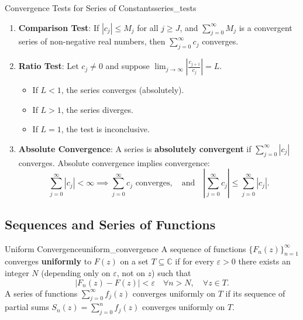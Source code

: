 \begin{theorem}{Convergence Tests for Series of Constants}{series_tests}
\begin{enumerate}
    \item \textbf{Comparison Test}: If $|c_j| \le M_j$ for all $j \ge J$, and $\sum_{j=0}^\infty M_j$ is a convergent series of non-negative real numbers, then $\sum_{j=0}^\infty c_j$ converges.
    \item \textbf{Ratio Test}: Let $c_j \neq 0$ and suppose $\lim_{j \to \infty} \left| \frac{c_{j+1}}{c_j} \right| = L$.
    \begin{itemize}
        \item If $L < 1$, the series converges (absolutely).
        \item If $L > 1$, the series diverges.
        \item If $L = 1$, the test is inconclusive.
    \end{itemize}
    \item \textbf{Absolute Convergence}: A series is \textbf{absolutely convergent} if $\sum_{j=0}^\infty |c_j|$ converges. Absolute convergence implies convergence:
    \begin{equation}
    \sum_{j=0}^\infty |c_j| < \infty \implies \sum_{j=0}^\infty c_j \text{ converges}, \quad \text{and} \quad \left| \sum_{j=0}^\infty c_j \right| \le \sum_{j=0}^\infty |c_j|.
    \end{equation}
\end{enumerate}
\end{theorem}

\subsection{Sequences and Series of Functions}

\begin{definition}{Uniform Convergence}{uniform_convergence}
A sequence of functions $\{F_n(z)\}_{n=1}^\infty$ converges \textbf{uniformly} to $F(z)$ on a set $T \subseteq \mathbb{C}$ if for every $\varepsilon > 0$ there exists an integer $N$ (depending only on $\varepsilon$, not on $z$) such that
\begin{equation}
|F_n(z) - F(z)| < \varepsilon \quad \forall n > N, \quad \forall z \in T.
\end{equation}
A series of functions $\sum_{j=0}^\infty f_j(z)$ converges uniformly on $T$ if its sequence of partial sums $S_n(z) = \sum_{j=0}^n f_j(z)$ converges uniformly on $T$.
\end{definition}

